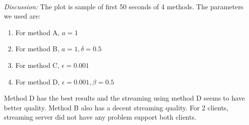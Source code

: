\documentclass[12pt]{article}
\newenvironment{problem}[2][Problem]{\begin{trivlist}
\item[\hskip \labelsep {\bfseries #1}\hskip \labelsep {\bfseries #2.}]}{\end{trivlist}}
\begin{document}
\begin{problem}{1}
\\
\textit{Discussion:}
The plot is sample of first 50 seconds of 4 methods. The parameters we used are:
\begin{enumerate}
	\item For method A, $a = 1$
	\item For method B, $a = 1, \delta = 0.5$
	\item For method C, $\epsilon = 0.001$
	\item For method D, $\epsilon = 0.001, \beta = 0.5$
\end{enumerate}
Method D has the best results and the streaming using method D seems to have better quality. Method B also has a decent streaming quality. For 2 clients, streaming server did not have any problem support both clients.
\end{problem}
\end{document}
